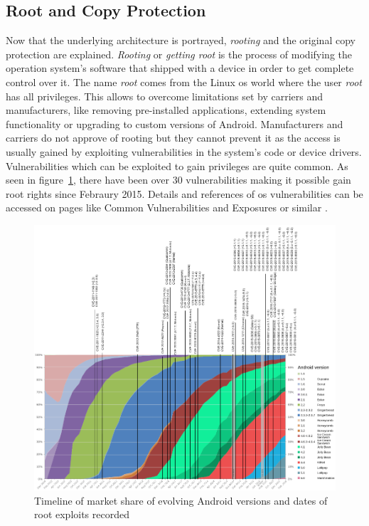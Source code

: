 \subsection{Root and Copy Protection} \label{subsection:android-copyroot}
Now that the underlying architecture is portrayed, \textit{rooting} and the original copy protection are explained.
\textit{Rooting} or \textit{getting root} is the process of modifying the operation system's software that shipped with a device in order to get complete control over it.
The name \textit{root} comes from the Linux \gls{os} world where the user \textit{root} has all privileges.
This allows to overcome limitations set by carriers and manufacturers, like removing pre-installed applications, extending system functionality or upgrading to custom versions of Android.
Manufacturers and carriers do not approve of rooting but they cannot prevent it as the access is usually gained by exploiting vulnerabilities in the system's code or device drivers.
Vulnerabilities which can be exploited to gain privileges are quite common.
As seen in figure~\ref{fig:root}, there have been over 30 vulnerabilities making it possible gain root rights since Febraury 2015.
Details and references of \gls{os} vulnerabilities can be accessed on pages like Common Vulnerabilities and Exposures or similar \cite{cveAndroidPriv} \cite{cveDetails}.
\newline
\begin{figure}[h]
    \centering
    \includegraphics[width=1\textwidth]{data/timeline.png}
    \caption{Timeline of market share of evolving Android versions and dates of root exploits recorded \cite{distributionRoot} \cite{androidVulnerabilities} \cite{cveAndroidPriv} \cite{cveDetails}}
    \label{fig:root}
\end{figure}
